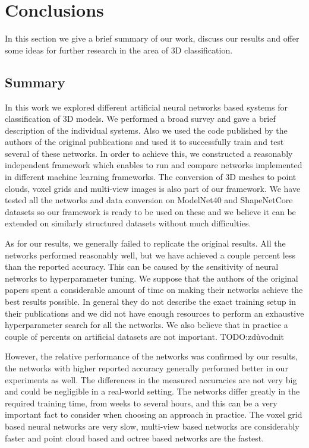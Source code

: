 \chapter{Conclusions}
\label{sec:chap6}
In this section we give a brief summary of our work, discuss our results and offer some ideas for further research in the area of 3D classification.
\section{Summary}
In this work we explored different artificial neural networks based systems for classification of 3D models. We performed a broad survey and gave a brief description of the individual systems. Also we used the code published by the authors of the original publications and used it to successfully train and test several of these networks. In order to achieve this, we constructed a reasonably independent framework which enables to run and compare networks implemented in different machine learning frameworks. The conversion of 3D meshes to point clouds, voxel grids and multi-view images is also part of our framework. We have tested all the networks and data conversion on ModelNet40 and ShapeNetCore datasets so our framework is ready to be used on these and we believe it can be extended on similarly structured datasets without much difficulties. \par
As for our results, we generally failed to replicate the original results. All the networks performed reasonably well, but we have achieved a couple percent less than the reported accuracy. This can be caused by the sensitivity of neural networks to hyperparameter tuning. We suppose that the authors of the original papers spent a considerable amount of time on  making their networks achieve the best results possible. In general they do not describe the exact training setup in their publications and we did not have enough resources to perform an exhaustive hyperparameter search for all the networks. We also believe that in practice a couple of percents on artificial datasets are not important. TODO:zdůvodnit\par
However, the relative performance of the networks was confirmed by our results, the networks with higher reported accuracy generally performed better in our experiments as well. The differences in the measured accuracies are not very big and could be negligible in a real-world setting. The networks differ greatly in the required training time, from weeks to several hours, and this can be a very important fact to consider when choosing an approach in practice. The voxel grid based neural networks are very slow, multi-view based networks are considerably faster and point cloud based and octree based networks are the fastest. 

